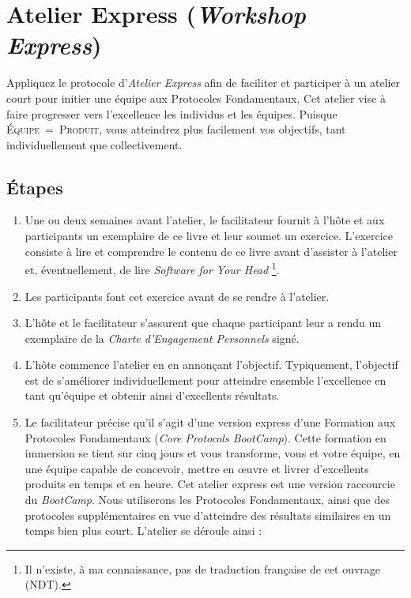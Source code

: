 \documentclass[paper=6in:9in,pagesize=pdftex,headinclude=on,footinclude=on,12pt]{scrbook}
\begin{document}
\section{Atelier Express (\emph{Workshop Express})} \label{atelier-express}

Appliquez le protocole d'\emph{Atelier Express} afin de faciliter et participer à un atelier court pour initier une équipe aux Protocoles Fondamentaux. Cet
atelier vise à faire progresser vers l'excellence les individus et les équipes. Puisque \textsc{Équipe~=~Produit}, vous atteindrez plus facilement vos
objectifs, tant individuellement que collectivement.

\subsection{Étapes}
\begin{enumerate}
	\item Une ou deux semaines avant l'atelier, le facilitateur fournit à l'hôte et aux participants un exemplaire de ce livre et leur soumet un exercice. L'exercice consiste à
          lire et comprendre le contenu de ce livre avant d'assister à l'atelier et, éventuellement, de lire \emph{Software for Your Head}
	      \footnote{Il n'existe, à ma connaissance, pas de traduction française de cet ouvrage (NDT).}.
	\item Les participants font cet exercice avant de se rendre à l'atelier.
	\item L'hôte et le facilitateur s'assurent que chaque participant leur a rendu un exemplaire de la \emph{Charte d'Engagement Personnels} signé.
	\item L'hôte commence l'atelier en en annonçant l'objectif. Typiquement, l'objectif est de s'améliorer individuellement pour atteindre ensemble l'excellence en tant
	      qu'équipe et obtenir ainsi d'excellents résultats.
	\item Le facilitateur précise qu'il s'agit d'une version \og{}express\fg{} d'une Formation aux Protocoles Fondamentaux (\emph{Core Protocols BootCamp}). Cette
	      formation en immersion se tient sur cinq jours et vous transforme, vous et votre équipe, en une équipe capable de concevoir, mettre en œuvre et livrer d'excellents
	      produits en temps et en heure. Cet atelier express est une version raccourcie du \emph{BootCamp}. Nous utiliserons les Protocoles Fondamentaux, ainsi que des protocoles
            supplémentaires en vue d'atteindre des résultats similaires en un temps bien plus court. L'atelier se déroule ainsi :

\end{enumerate}
\end{document}
